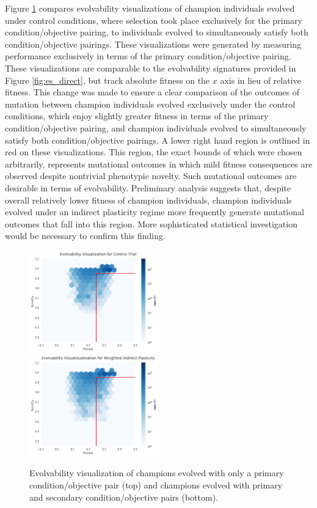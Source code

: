 Figure \ref{fig:ev_indirect} compares evolvability visualizations of champion individuals evolved under control conditions, where selection took place exclusively for the primary condition/objective pairing, to individuals evolved to simultaneously satisfy both condition/objective pairings.
These visualizations were generated by measuring performance exclusively in terms of the primary condition/objective pairing.
These visualizations are comparable to the evolvability signatures provided in Figure \ref{fig:es_direct}, but track absolute fitness on the $x$ axis in lieu of relative fitness.
This change was made to ensure a clear comparison of the outcomes of mutation between champion individuals evolved exclusively under the control conditions, which enjoy slightly greater fitness in terms of the primary condition/objective pairing, and champion individuals evolved to simultaneously satisfy both condition/objective pairings.
A lower right hand region is outlined in red on these visualizations.
This region, the exact bounds of which were chosen arbitrarily, represents mutational outcomes in which mild fitness consequences are observed despite nontrivial phenotypic novelty.
Such mutational outcomes are desirable in terms of evolvability.
Preliminary analysis suggests that, despite overall relatively lower fitness of champion individuals, champion individuals evolved under an indirect plasticity regime more frequently generate mutational outcomes that fall into this region. 
More sophisticated statistical investigation would be necessary to confirm this finding.

\begin{figure}
    \centering
    \includegraphics[width=0.5\textwidth]{img/ev_w0_target} \\
     \includegraphics[width=0.5\textwidth]{img/ev_w0_2_target}
  	\caption{Evolvability visualization of champions evolved with only a primary condition/objective pair (top) and champions evolved with primary and secondary condition/objective pairs (bottom).}
    \label{fig:ev_indirect}
\end{figure}

